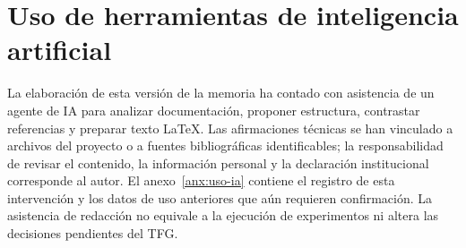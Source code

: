 \section{Uso de herramientas de inteligencia artificial}
\label{sec:uso-ia}
La elaboración de esta versión de la memoria ha contado con asistencia de un agente de IA para analizar documentación, proponer estructura, contrastar referencias y preparar texto LaTeX. Las afirmaciones técnicas se han vinculado a archivos del proyecto o a fuentes bibliográficas identificables; la responsabilidad de revisar el contenido, la información personal y la declaración institucional corresponde al autor. El anexo~\ref{anx:uso-ia} contiene el registro de esta intervención y los datos de uso anteriores que aún requieren confirmación. La asistencia de redacción no equivale a la ejecución de experimentos ni altera las decisiones pendientes del TFG.
